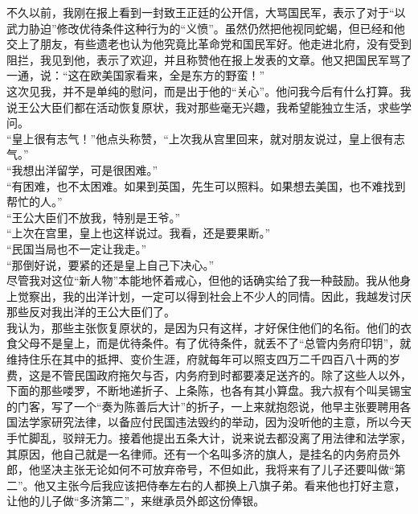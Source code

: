 不久以前，我刚在报上看到一封致王正廷的公开信，大骂国民军，表示了对于“以武力胁迫”修改优待条件这种行为的“义愤”。虽然仍然把他视同蛇蝎，但已经和他交上了朋友，有些遗老也认为他究竟比革命党和国民军好。他走进北府，没有受到阻拦，我见到他，表示了欢迎，并且称赞他在报上发表的文章。他又把国民军骂了一通，说：“这在欧美国家看来，全是东方的野蛮！”\\

这次见我，并不是单纯的慰问，而是出于他的“关心”。他问我今后有什么打算。我说王公大臣们都在活动恢复原状，我对那些毫无兴趣，我希望能独立生活，求些学问。\\

“皇上很有志气！”他点头称赞，“上次我从宫里回来，就对朋友说过，皇上很有志气。”\\

“我想出洋留学，可是很困难。”\\

“有困难，也不太困难。如果到英国，先生可以照料。如果想去美国，也不难找到帮忙的人。”\\

“王公大臣们不放我，特别是王爷。”\\

“上次在宫里，皇上也这样说过。我看，还是要果断。”\\

“民国当局也不一定让我走。”\\

“那倒好说，要紧的还是皇上自己下决心。”\\

尽管我对这位“新人物”本能地怀着戒心，但他的话确实给了我一种鼓励。我从他身上觉察出，我的出洋计划，一定可以得到社会上不少人的同情。因此，我越发讨厌那些反对我出洋的王公大臣们了。\\

我认为，那些主张恢复原状的，是因为只有这样，才好保住他们的名衔。他们的衣食父母不是皇上，而是优待条件。有了优待条件，就丢不了“总管内务府印钥”，就维持住乐在其中的抵押、变价生涯，府就每年可以照支四万二千四百八十两的岁费，这是不管民国政府拖欠与否，内务府到时都要凑足送齐的。除了这些人以外，下面的那些喽罗，不断地递折子、上条陈，也各有其小算盘。我六叔有个叫吴锡宝的门客，写了一个“奏为陈善后大计”的折子，一上来就抱怨说，他早主张要聘用各国法学家研究法律，以备应付民国违法毁约的举动，因为没听他的主意，所以今天手忙脚乱，驳辩无力。接着他提出五条大计，说来说去都没离了用法律和法学家，其原因，他自己就是一名律师。还有一个名叫多济的旗人，是挂名的内务府员外郎，他坚决主张无论如何不可放弃帝号，不但如此，我将来有了儿子还要叫做“第二”。他又主张今后我应该把侍奉左右的人都换上八旗子弟。看来他也打好主意，让他的儿子做“多济第二”，来继承员外郎这份俸银。\\

